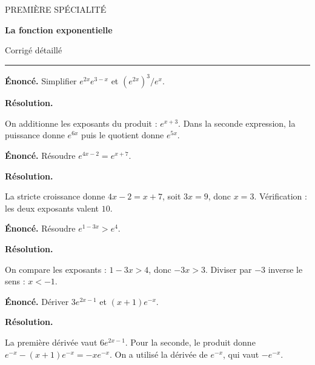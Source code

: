 \documentclass[11pt,a4paper]{article}
\begin{document}
{\small\color{Blue}PREMIÈRE SPÉCIALITÉ}\par{\LARGE\bfseries La fonction exponentielle}\par{\large Corrigé détaillé}\par\vspace{0.2cm}\hrule\vspace{0.4cm}
\par\noindent\begin{minipage}{\linewidth}
{\small\color{Muted}\textbf{Énoncé.} Simplifier $e^{2x}e^{3-x}$ et $(e^{2x})^3/e^x$.}
\par\medskip
\textbf{Résolution.}\par
On additionne les exposants du produit : $e^{x+3}$. Dans la seconde expression, la puissance donne $e^{6x}$ puis le quotient donne $e^{5x}$.
\end{minipage}\par
\par\noindent\begin{minipage}{\linewidth}
{\small\color{Muted}\textbf{Énoncé.} Résoudre $e^{4x-2}=e^{x+7}$.}
\par\medskip
\textbf{Résolution.}\par
La stricte croissance donne $4x-2=x+7$, soit $3x=9$, donc $x=3$. Vérification : les deux exposants valent $10$.
\end{minipage}\par
\par\noindent\begin{minipage}{\linewidth}
{\small\color{Muted}\textbf{Énoncé.} Résoudre $e^{1-3x}>e^4$.}
\par\medskip
\textbf{Résolution.}\par
On compare les exposants : $1-3x>4$, donc $-3x>3$. Diviser par $-3$ inverse le sens : $x<-1$.
\end{minipage}\par
\par\noindent\begin{minipage}{\linewidth}
{\small\color{Muted}\textbf{Énoncé.} Dériver $3e^{2x-1}$ et $(x+1)e^{-x}$.}
\par\medskip
\textbf{Résolution.}\par
La première dérivée vaut $6e^{2x-1}$. Pour la seconde, le produit donne $e^{-x}-(x+1)e^{-x}=-xe^{-x}$. On a utilisé la dérivée de $e^{-x}$, qui vaut $-e^{-x}$.
\end{minipage}\par
\end{document}
